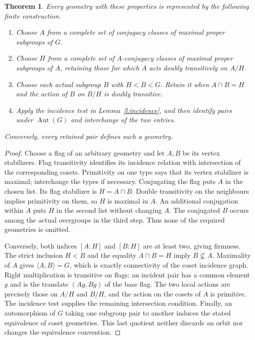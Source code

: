 \documentclass[11pt]{article}
\newtheorem{theorem}{Theorem}
\newcommand{\Aut}{\operatorname{Aut}}
\begin{document}
\begin{theorem}\label{t:enumeration}
Every geometry with these properties is represented by the following
finite construction.
\begin{enumerate}
\item Choose $A$ from a complete set of conjugacy classes of maximal
proper subgroups of $G$.
\item Choose $H$ from a complete set of $A$-conjugacy classes of maximal
proper subgroups of $A$, retaining those for which $A$ acts doubly
transitively on $A/H$.
\item Choose each actual subgroup $B$ with $H<B<G$. Retain it
when $A\cap B=H$ and the action of $B$ on $B/H$ is doubly transitive.
\item Apply the incidence test in Lemma~\ref{l:incidence}, and then
identify pairs under $\Aut(G)$ and interchange of the two entries.
\end{enumerate}
Conversely, every retained pair defines such a geometry.
\end{theorem}
\begin{proof}
Choose a flag of an arbitrary geometry and let $A,B$ be its vertex
stabilizers. Flag transitivity identifies its incidence relation with
intersection of the corresponding cosets. Primitivity on one type says
that its vertex stabilizer is maximal; interchange the types if necessary.
Conjugating the flag puts $A$ in the chosen list. Its flag stabilizer is
$H=A\cap B$. Double transitivity on the neighbours implies primitivity
on them, so $H$ is maximal in $A$. An additional conjugation within $A$
puts $H$ in the second list without changing $A$. The conjugated $B$
occurs among the actual overgroups in the third step. Thus none of the
required geometries is omitted.

Conversely, both indices $[A:H]$ and $[B:H]$ are at least two, giving
firmness. The strict inclusion $H<B$ and the equality $A\cap B=H$
imply $B\nsubseteq A$. Maximality of $A$ gives $\langle A,B\rangle=G$,
which is exactly connectivity of the coset incidence graph. Right
multiplication is transitive on flags: an incident pair has a common
element $g$ and is the translate $(Ag,Bg)$ of the base flag. The two
local actions are precisely those on $A/H$ and $B/H$, and the action on
the cosets of $A$ is primitive. The incidence test supplies the remaining
intersection condition. Finally, an automorphism of $G$ taking one
subgroup pair to another induces the stated equivalence of coset
geometries. This last quotient neither discards an orbit nor changes the
equivalence convention.
\end{proof}
\end{document}
